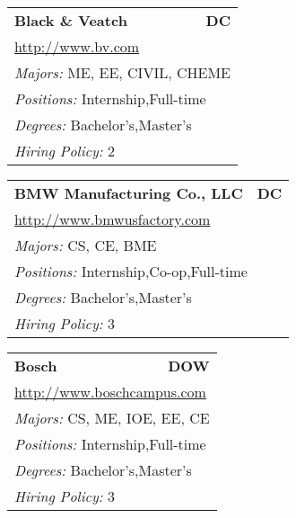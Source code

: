 \documentclass[twoside]{article}
\begin{document}
\begin{center}
\begin{multicols}{3}
\begin{FlushLeft}
\begin{minipage}{\columnwidth}
\end{minipage}
 
\begin{minipage}{\columnwidth}\begin{tabularx}{.95\columnwidth}{Xr}
                 {\Large\bf Black \& Veatch} & {\Large\bf DC}\\
    \multicolumn{2}{p{.95\columnwidth}}{\url{http://www.bv.com}}\\
    \multicolumn{2}{p{.95\columnwidth}}{\emph{Majors:} ME, EE, CIVIL, CHEME}\\
    \multicolumn{2}{p{.95\columnwidth}}{\emph{Positions:} Internship,Full-time}\\
    \multicolumn{2}{p{.95\columnwidth}}{\emph{Degrees:} Bachelor's,Master's}\\
    \multicolumn{2}{p{.95\columnwidth}}{\emph{Hiring Policy:} 2}\\
    \end{tabularx}
    
\end{minipage}
 
\begin{minipage}{\columnwidth}\begin{tabularx}{.95\columnwidth}{Xr}
                 {\Large\bf BMW Manufacturing Co., LLC} & {\Large\bf DC}\\
    \multicolumn{2}{p{.95\columnwidth}}{\url{http://www.bmwusfactory.com}}\\
    \multicolumn{2}{p{.95\columnwidth}}{\emph{Majors:} CS, CE, BME}\\
    \multicolumn{2}{p{.95\columnwidth}}{\emph{Positions:} Internship,Co-op,Full-time}\\
    \multicolumn{2}{p{.95\columnwidth}}{\emph{Degrees:} Bachelor's,Master's}\\
    \multicolumn{2}{p{.95\columnwidth}}{\emph{Hiring Policy:} 3}\\
    \end{tabularx}
    
\end{minipage}
 
\begin{minipage}{\columnwidth}\begin{tabularx}{.95\columnwidth}{Xr}
                 {\Large\bf Bosch} & {\Large\bf DOW}\\
    \multicolumn{2}{p{.95\columnwidth}}{\url{http://www.boschcampus.com}}\\
    \multicolumn{2}{p{.95\columnwidth}}{\emph{Majors:} CS, ME, IOE, EE, CE}\\
    \multicolumn{2}{p{.95\columnwidth}}{\emph{Positions:} Internship,Full-time}\\
    \multicolumn{2}{p{.95\columnwidth}}{\emph{Degrees:} Bachelor's,Master's}\\
    \multicolumn{2}{p{.95\columnwidth}}{\emph{Hiring Policy:} 3}\\
    \end{tabularx}
    

\end{minipage}
\end{FlushLeft}
\end{multicols}
\end{center}
\end{document}
